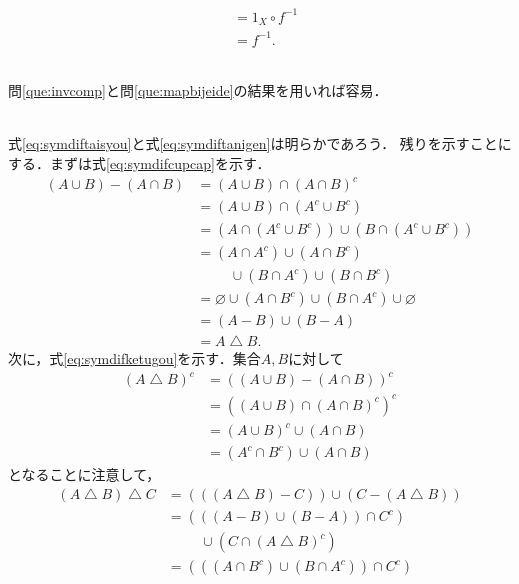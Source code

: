 \begin{description}
\begin{align*}
      & = 1_X \circ f^{-1} \\
      & = f^{-1}.
  \end{align*}
\item[\refque{que:invcompgf}] \mbox{} \\
  問\ref{que:invcomp}と問\ref{que:mapbijeide}の結果を用いれば容易．
\item[\refque{que:taisyousa}] \mbox{} \\
  式\eqref{eq:symdiftaisyou}と式\eqref{eq:symdiftanigen}は明らかであろう．
  残りを示すことにする．まずは式\eqref{eq:symdifcupcap}を示す．
  \begin{align*}
    (A \cup B) - (A \cap B) & = (A \cup B) \cap (A \cap B)^c \\
                            & = (A \cup B) \cap (A^c \cup B^c) \\
                            & = (A \cap (A^c \cup B^c)) \cup (B \cap (A^c \cup B^c)) \\
                            & = (A \cap A^c) \cup (A \cap B^c) \\
                            & \hspace{1cm} \cup (B \cap A^c) \cup (B \cap B^c) \\
                            & = \varnothing \cup (A \cap B^c) \cup (B \cap A^c) \cup \varnothing \\
                            & = (A -B) \cup (B-A) \\
                            & = A \bigtriangleup B.
  \end{align*}
  次に，式\eqref{eq:symdifketugou}を示す．集合$A,  B$に対して
  \begin{align*}
    (A \bigtriangleup B)^c 
    & = ((A \cup B) - (A \cap B) )^c \\
    & = ((A \cup B) \cap (A \cap B)^c)^c \\
    & = (A \cup B)^c \cup (A \cap B) \\
    & = (A^c \cap B^c) \cup (A \cap B)
  \end{align*}
  となることに注意して，
  \begin{align*}
    (A \bigtriangleup B) \bigtriangleup C 
    & = (((A \bigtriangleup B)-C)) \cup (C- (A \bigtriangleup B)) \\
    & = (((A-B) \cup (B-A)) \cap C^c) \\
    & \hspace{1cm} \cup (C \cap (A \bigtriangleup B)^c) \\
    & = (((A \cap B^c) \cup (B \cap A^c)) \cap C^c) \\

\end{align*}
\end{description}
